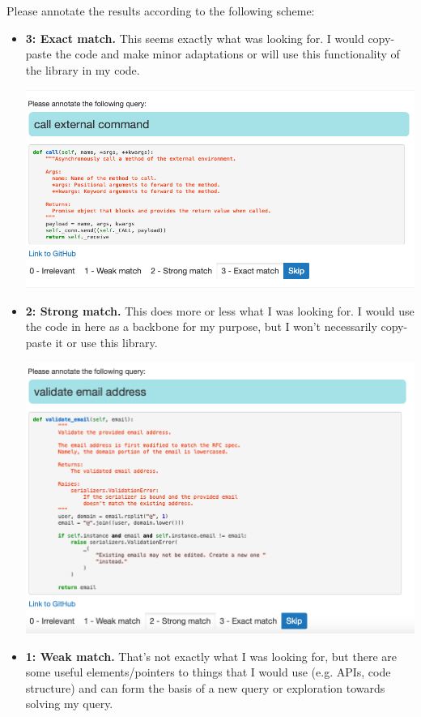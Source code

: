 \documentclass[12 pt]{article}
\begin{document}
Please annotate the results according to the following scheme:
\begin{itemize}
	\item {\bf 3: Exact match.} This seems exactly what was looking for. I would copy-paste the code and make minor adaptations or will use this functionality of the library in my code. 

	\includegraphics[width=\textwidth]{exact_match.png}
	\item {\bf 2: Strong match.} This does more or less what I was looking for. I would use the code in here as a backbone for my purpose, but I won't necessarily copy-paste it or use this library.

	\includegraphics[width=\textwidth]{strong_match}
	\item {\bf 1: Weak match.} That's not exactly what I was looking for, but there are some useful elements/pointers to things that I would use (e.g. APIs, code structure) and can form the basis of a new query or exploration towards solving my query.


\end{itemize}
\end{document}
